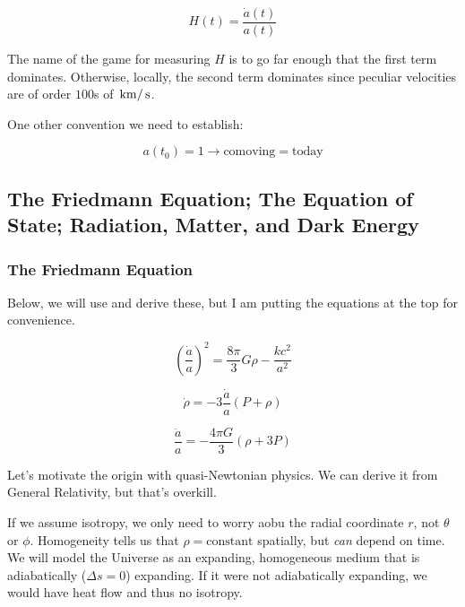 \documentclass{article}
\newcommand{\unit}[1]{{\,\rm #1}}
\newcommand{\s}{\unit{s}}
\newcommand{\km}{\unit{km}}
\begin{document}
\begin{equation}
    \boxed{H(t) = \frac{\dot{a}(t)}{a(t)}}
\end{equation}

The name of the game for measuring $H$ is to go far enough that the first term dominates. Otherwise, locally, the second term dominates since peculiar velocities are of order $100$s of $\km/\s$. 

One other convention we need to establish:

\begin{equation}
    a(t_0) = 1 \rightarrow \text{comoving} = \text{today}
\end{equation}

\subsection{The Friedmann Equation; The Equation of State; Radiation, Matter, and Dark Energy}

\subsubsection{The Friedmann Equation}

Below, we will use and derive these, but I am putting the equations at the top for convenience. 

\begin{equation}
    \boxed{\left(\frac{\dot{a}}{a}\right)^2 = \frac{8\pi}{3} G \rho - \frac{kc^2}{a^2}}
\end{equation}

\begin{equation}
    \boxed{\dot{\rho} = -3 \frac{\dot{a}}{a} \left(P + \rho\right)}
\end{equation}

\begin{equation}
    \boxed{\frac{\ddot{a}}{a} = - \frac{4\pi G}{3}\left(\rho +  3P\right)}
\end{equation}

Let's motivate the origin with quasi-Newtonian physics. We can derive it from General Relativity, but that's overkill.

If we assume isotropy, we only need to worry aobu the radial coordinate $r$, not $\theta$ or $\phi$. Homogeneity tells us that $\rho = \text{constant}$ spatially, but \textit{can} depend on time. We will model the Universe as an expanding, homogeneous medium that is adiabatically ($\Delta s =0$) expanding. If it were not adiabatically expanding, we would have heat flow and thus no isotropy. 
\end{document}
